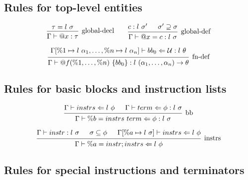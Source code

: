 \documentclass{article}
\begin{document}
\subsection{Rules for top-level entities}

\[    
\begin{prooftree}
    \hypo{\tau = l\ \sigma}
    \infer1[global-decl]{\Gamma \vdash @x : \tau}
\end{prooftree}
\qquad
\begin{prooftree}
    \hypo{c : l\ \sigma'}
    \hypo{\sigma' \supseteq \sigma}
    \infer2[global-def]{\Gamma \vdash @x = c : l\ \sigma}
\end{prooftree}
\]

\[
\begin{prooftree}
    \hypo{
    \begin{matrix}
        \Gamma[\%1 \mapsto l\ \alpha_1, \ldots, \%n \mapsto l\ \alpha_n] \vdash bb_0 \Leftarrow \mathcal{U} : l\ \theta \\
    \end{matrix}
    }
    \infer1[fn-def]{\Gamma \vdash @f(\%1, \dots, \%n)\ \{ bb_0 \} : l\ (\alpha_1, \dots, \alpha_n) \rightarrow \theta}
    
\end{prooftree}
\]

\subsection{Rules for basic blocks and instruction lists}

\[
\begin{prooftree} 
    \hypo{\Gamma \vdash instrs \Leftarrow l\ \phi}
    \hypo{\Gamma \vdash term \Leftarrow \phi : l\ \sigma}
    \infer2[bb]{\Gamma \vdash \%b = instrs\ term \Leftarrow \phi : l\ \sigma}
\end{prooftree} 
\]

\[
\begin{prooftree} 
    \hypo{\Gamma \vdash instr : l\ \sigma}
    \hypo{\sigma \subseteq \phi}
    \hypo{\Gamma[\%a \mapsto l\ \sigma] \vdash instrs \Leftarrow l\ \phi}
    \infer3[instrs]{\Gamma \vdash \%a = instr; instrs \Leftarrow l\ \phi}
\end{prooftree} 
\]

\subsection{Rules for special instructions and terminators}
\end{document}

